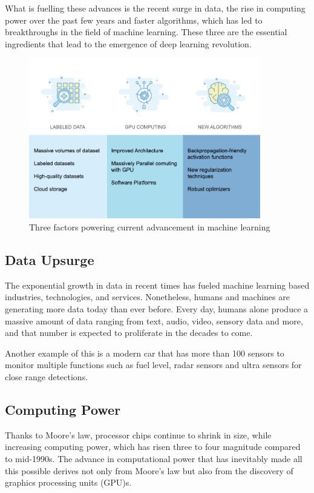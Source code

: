What is fuelling these advances is the recent surge in data, the rise in computing power over the past few years and faster algorithms, which has led to breakthroughs in the field of machine learning. These three are the essential ingredients that lead to the emergence of deep learning revolution.

\begin{figure}[htbp]
\centering
\includegraphics[width=0.90\textwidth]{images/bg-drive-factors.png}
\caption{Three factors powering current advancement in machine learning}
\label{3-factors}
\end{figure}

\subsection{Data Upsurge}
The exponential growth in data in recent times has fueled machine learning based industries, technologies, and services. Nonetheless, humans and machines are generating more data today than ever before. Every day, humans alone produce a massive amount of data ranging from text, audio, video, sensory data and more, and that number is expected to proliferate in the decades to come. 

Another example of this is a modern car that has more than 100 sensors to monitor multiple functions such as fuel level, radar sensors and ultra sensors for close range detections.

\subsection{Computing Power}
Thanks to Moore’s law, processor chips continue to shrink in size, while increasing computing power, which has risen three to four magnitude compared to mid-1990s. The advance in computational power that has inevitably made all this possible derives not only from Moore’s law but also from the discovery of graphics processing units (GPU)s.

